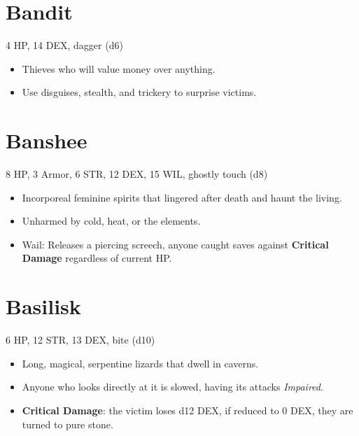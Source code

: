 \documentclass[
  10pt,
  american,
]{article}
\begin{document}
\hypertarget{bandit}{%
\section{Bandit}\label{bandit}}

4 HP, 14 DEX, dagger (d6)

\begin{samepage}
\begin{itemize}
\setlength\itemsep{-.5em}
\item Thieves who will value money over anything.
\item Use disguises, stealth, and trickery to surprise victims.
\end{itemize}
\end{samepage}

\hypertarget{banshee}{%
\section{Banshee}\label{banshee}}

8 HP, 3 Armor, 6 STR, 12 DEX, 15 WIL, ghostly touch (d8)

\begin{samepage}
\begin{itemize}
\setlength\itemsep{-.5em}
\item Incorporeal feminine spirits that lingered after death and haunt the living.
\item Unharmed by cold, heat, or the elements.
\item Wail: Releases a piercing screech, anyone caught saves against \textbf{Critical Damage} regardless of current HP.
\end{itemize}
\end{samepage}

\hypertarget{basilisk}{%
\section{Basilisk}\label{basilisk}}

6 HP, 12 STR, 13 DEX, bite (d10)

\begin{samepage}
\begin{itemize}
\setlength\itemsep{-.5em}
\item Long, magical, serpentine lizards that dwell in caverns.
\item Anyone who looks directly at it is slowed, having its attacks \emph{Impaired}.
\item \textbf{Critical Damage}: the victim loses d12 DEX, if reduced to 0 DEX, they are turned to pure stone.
\end{itemize}
\end{samepage}
\end{document}
